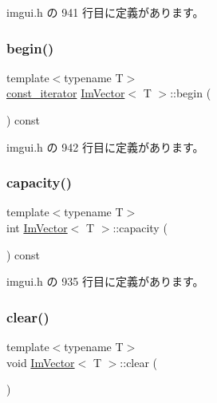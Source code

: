  imgui.\+h の 941 行目に定義があります。

\mbox{\label{class_im_vector_ac72cd4105b5c6a7f76157df945b39d4c}} 
\subsubsection{\texorpdfstring{begin()}{begin()}\hspace{0.1cm}{\footnotesize\ttfamily [2/2]}}
{\footnotesize\ttfamily template$<$typename T$>$ \\
\mbox{\hyperlink{class_im_vector_aedeac9c5080f9d6ce96ae837768ee4c4}{const\+\_\+iterator}} \mbox{\hyperlink{class_im_vector}{Im\+Vector}}$<$ T $>$\+::begin (\begin{DoxyParamCaption}{ }\end{DoxyParamCaption}) const\hspace{0.3cm}{\ttfamily [inline]}}



 imgui.\+h の 942 行目に定義があります。

\mbox{\label{class_im_vector_ac17681baa8b9b5cd97e556da29f9ef73}} 
\subsubsection{\texorpdfstring{capacity()}{capacity()}}
{\footnotesize\ttfamily template$<$typename T$>$ \\
int \mbox{\hyperlink{class_im_vector}{Im\+Vector}}$<$ T $>$\+::capacity (\begin{DoxyParamCaption}{ }\end{DoxyParamCaption}) const\hspace{0.3cm}{\ttfamily [inline]}}



 imgui.\+h の 935 行目に定義があります。

\mbox{\label{class_im_vector_ae2d401b4ec5f1113cdb8edb5a61a38f7}} 
\subsubsection{\texorpdfstring{clear()}{clear()}}
{\footnotesize\ttfamily template$<$typename T$>$ \\
void \mbox{\hyperlink{class_im_vector}{Im\+Vector}}$<$ T $>$\+::clear (\begin{DoxyParamCaption}{ }\end{DoxyParamCaption})\hspace{0.3cm}{\ttfamily [inline]}}



